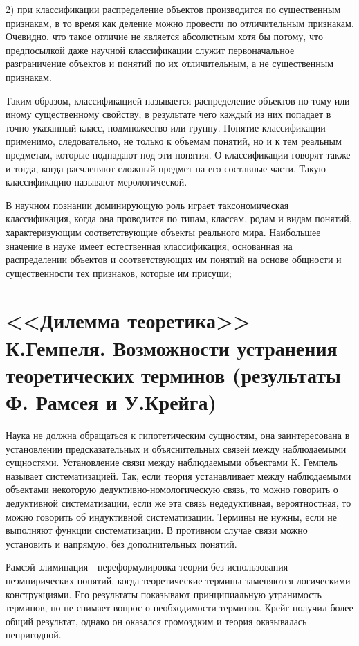 \documentclass[12pt, specialist, subf, substylefile = spbu.rtx]{disser}
\begin{document}
2) при классификации распределение объектов производится по существенным признакам, в то время как деление можно провести по отличительным признакам. Очевидно, что такое отличие не является абсолютным хотя бы потому, что предпосылкой даже научной классификации служит первоначальное разграничение объектов и понятий по их отличительным, а не существенным признакам.

Таким образом, классификацией называется распределение объектов по тому или иному существенному свойству, в результате чего каждый из них попадает в точно указанный класс, подмножество или группу. Понятие классификации применимо, следовательно, не только к объемам понятий, но и к тем реальным предметам, которые подпадают под эти понятия. О классификации говорят также и тогда, когда расчленяют сложный предмет на его составные части. Такую классификацию называют мерологической.

В научном познании доминирующую роль играет таксономическая классификация, когда она проводится по типам, классам, родам и видам понятий, характеризующим соответствующие объекты реального мира. Наибольшее значение в науке имеет естественная классификация, основанная на распределении объектов и соответствующих им понятий на основе общности и существенности тех признаков, которые им присущи;

\section{<<Дилемма теоретика>> К.Гемпеля. Возможности устранения теоретических терминов (результаты Ф. Рамсея и У.Крейга)}
Наука не должна обращаться к гипотетическим сущностям, она заинтересована в установлении предсказательных и объяснительных связей между наблюдаемыми сущностями. Установление связи между наблюдаемыми объектами К. Гемпель называет систематизацией. Так, если теория устанавливает между наблюдаемыми объектами некоторую дедуктивно-номологическую связь, то можно говорить о дедуктивной систематизации, если же эта связь недедуктивная, вероятностная, то можно говорить об индуктивной систематизации. Термины не нужны, если не выполняют функции систематизации. В противном случае связи можно установить и напрямую, без дополнительных понятий.

Рамсэй-элиминация - переформулировка теории без использования неэмпирических понятий, когда теоретические термины заменяются логическими конструкциями. Его результаты показывают принципиальную утранимость терминов, но не снимает вопрос о необходимости терминов. Крейг получил более общий результат, однако он оказался громоздким и теория оказывалась непригодной.
\end{document}
